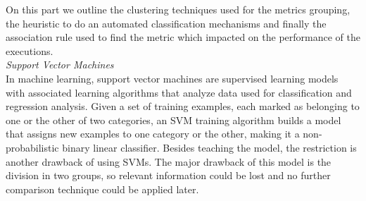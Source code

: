 On this part we outline the clustering techniques used for the metrics grouping, the heuristic to do an automated classification mechanisms and finally the association rule used to find the metric which impacted on the performance of the executions.\\

    
    
\textit{Support Vector Machines}\\
In machine learning, support vector machines are supervised learning models with associated learning algorithms that analyze data used for classification and regression analysis. Given a set of training examples, each marked as belonging to one or the other of two categories, an SVM training algorithm builds a model that assigns new examples to one category or the other, making it a non-probabilistic binary linear classifier. 
Besides teaching the model, the restriction is another drawback of using SVMs. The major drawback of this model is the division in two groups, so relevant information could be lost and no further comparison technique could be applied later.

    
    
